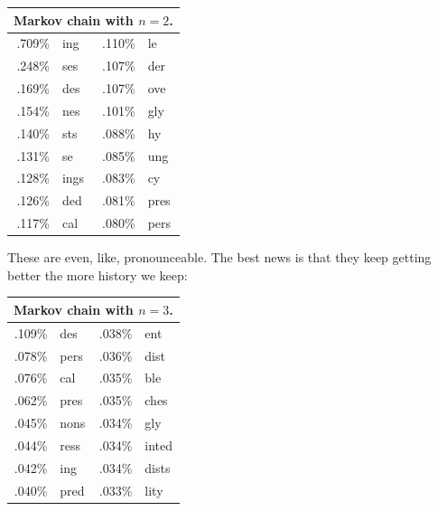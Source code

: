 \documentclass[twocolumn]{article}
\begin{document}
\begin{center}
\begin{tabular}{rl@{\quad\quad}rl}
\multicolumn{4}{c}{Markov chain with $n=2$.} \\
\hline
.709\% & ing     &   .110\% & le    \\
.248\% & ses     &   .107\% & der   \\
.169\% & des     &   .107\% & ove   \\
.154\% & nes     &   .101\% & gly   \\
.140\% & sts     &   .088\% & hy    \\
.131\% & se      &   .085\% & ung   \\
.128\% & ings    &   .083\% & cy    \\
.126\% & ded     &   .081\% & pres  \\
.117\% & cal     &   .080\% & pers  \\
\end{tabular}
\end{center}

These are even, like, pronounceable. The best news is that they keep
getting better the more history we keep:

\begin{center}
\begin{tabular}{rl@{\quad\quad}rl}
\multicolumn{4}{c}{Markov chain with $n=3$.} \\
\hline
.109\% & des     &   .038\%  & ent     \\
.078\% & pers    &   .036\%  & dist    \\
.076\% & cal     &   .035\%  & ble     \\
.062\% & pres    &   .035\%  & ches    \\
.045\% & nons    &   .034\%  & gly     \\
.044\% & ress    &   .034\%  & inted   \\
.042\% & ing     &   .034\%  & dists   \\
.040\% & pred    &   .033\%  & lity    \\
\end{tabular}
\end{center}
\end{document}
